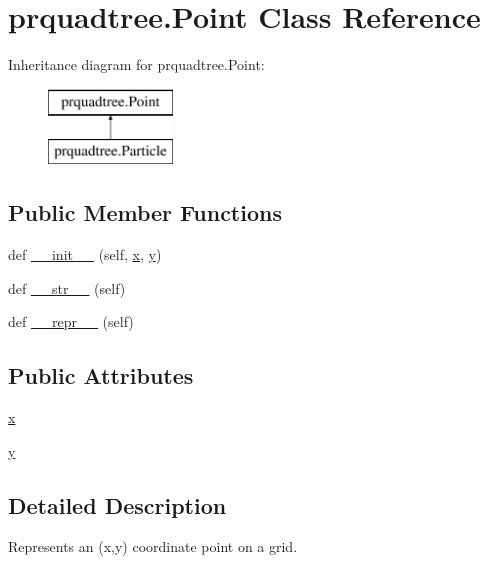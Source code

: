 \hypertarget{classprquadtree_1_1Point}{}\section{prquadtree.\+Point Class Reference}
\label{classprquadtree_1_1Point}
Inheritance diagram for prquadtree.\+Point\+:\begin{figure}[H]
\begin{center}
\leavevmode
\includegraphics[height=2.000000cm]{classprquadtree_1_1Point}
\end{center}
\end{figure}
\subsection*{Public Member Functions}
\begin{DoxyCompactItemize}
\item 
def \hyperlink{classprquadtree_1_1Point_a1179022b24fec8ea7a8e0a7e9e7f664d}{\+\_\+\+\_\+init\+\_\+\+\_\+} (self, \hyperlink{classprquadtree_1_1Point_a769eeb814487b26593281a720cc43813}{x}, \hyperlink{classprquadtree_1_1Point_acc50fd274155e9a89996263a7e9f20db}{y})
\item 
def \hyperlink{classprquadtree_1_1Point_ad33b3a05f6dce4daea0b307a42aa2453}{\+\_\+\+\_\+str\+\_\+\+\_\+} (self)
\item 
def \hyperlink{classprquadtree_1_1Point_a8a9a5215cda0279f6958a0b55b4bc11d}{\+\_\+\+\_\+repr\+\_\+\+\_\+} (self)
\end{DoxyCompactItemize}
\subsection*{Public Attributes}
\begin{DoxyCompactItemize}
\item 
\hyperlink{classprquadtree_1_1Point_a769eeb814487b26593281a720cc43813}{x}
\item 
\hyperlink{classprquadtree_1_1Point_acc50fd274155e9a89996263a7e9f20db}{y}
\end{DoxyCompactItemize}


\subsection{Detailed Description}
\begin{DoxyVerb}Represents an (x,y) coordinate point on a grid.
\end{DoxyVerb}
 

